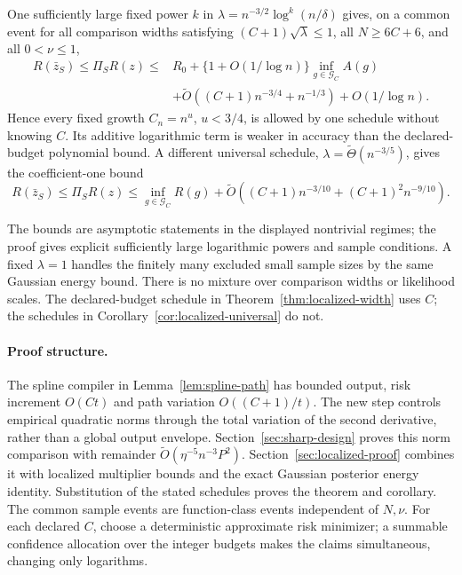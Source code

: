 \begin{corollary}
\label{cor:localized-universal}
One sufficiently large fixed power $k$ in
$\lambda=n^{-3/2}\log^k(n/\delta)$ gives, on a common event for all
comparison widths satisfying $(C+1)\sqrt\lambda\le1$, all
$N\ge6C+6$, and all $0<\nu\le1$,
\begin{align}
 R(\bar z_S)\le\Pi_SR(z)
 \le{}&R_0+\{1+O(1/\log n)\}\inf_{g\in\mathcal G_C}A(g)\\
 &+\widetilde O((C+1)n^{-3/4}+n^{-1/3})+O(1/\log n).
 \label{eq:localized-universal}
\end{align}
Hence every fixed growth $C_n=n^u$, $u<3/4$, is allowed by one
schedule without knowing $C$. Its additive logarithmic term is
weaker in accuracy than the declared-budget polynomial bound.
A different universal schedule,
$\lambda=\widetilde\Theta(n^{-3/5})$, gives the coefficient-one bound
\[
 R(\bar z_S)\le\Pi_SR(z)\le\inf_{g\in\mathcal G_C}R(g)
       +\widetilde O\left((C+1)n^{-3/10}
                          +(C+1)^2n^{-9/10}\right).
\]
\end{corollary}

The bounds are asymptotic statements in the displayed nontrivial
regimes; the proof gives explicit sufficiently large logarithmic
powers and sample conditions. A fixed $\lambda=1$ handles the finitely
many excluded small sample sizes by the same Gaussian energy bound.
There is no mixture over comparison widths or likelihood scales.
The declared-budget schedule in Theorem~\ref{thm:localized-width} uses
$C$; the schedules in Corollary~\ref{cor:localized-universal} do not.

\paragraph{Proof structure.}
The spline compiler in Lemma~\ref{lem:spline-path} has bounded output,
risk increment $O(Ct)$ and path variation $O((C+1)/t)$. The new step
controls empirical quadratic norms through the total variation of the
second derivative, rather than a global output envelope.
Section~\ref{sec:sharp-design} proves this norm comparison with
remainder $\widetilde O(\eta^{-5}n^{-3}P^2)$.
Section~\ref{sec:localized-proof} combines it with localized multiplier
bounds and the exact Gaussian posterior energy identity. Substitution
of the stated schedules proves the theorem and corollary. The common
sample events are function-class events independent of $N,\nu$.
For each declared $C$, choose a deterministic approximate risk minimizer;
a summable confidence allocation over the integer budgets makes the
claims simultaneous, changing only logarithms.

